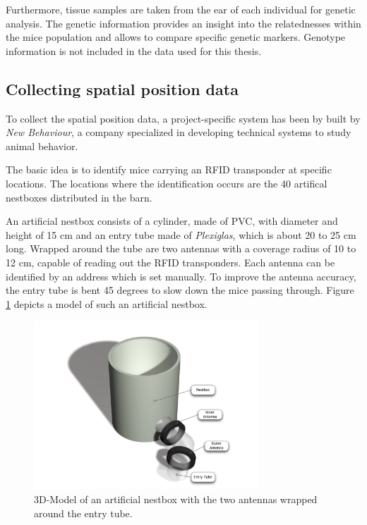 Furthermore, tissue samples are taken from the ear of each individual for genetic analysis. The genetic information provides an insight into the relatednesses within the mice population and allows to compare specific genetic markers. Genotype information is not included in the data used for this thesis.

\subsection{Collecting spatial position data}
\label{subsec:collectspatialpos}

To collect the spatial position data, a project-specific system has been by built by \textit{New Behaviour}, a company specialized in developing technical systems to study animal behavior. 

The basic idea is to identify mice carrying an RFID transponder at specific locations. The locations where the identification occurs are the 40 artifical nestboxes distributed in the barn. 

An artificial nestbox consists of a cylinder, made of \ac{PVC}, with diameter and height of 15 cm and an entry tube made of \textit{Plexiglas}, which is about 20 to 25 cm long. Wrapped around the tube are two antennas with a coverage radius of 10 to 12 cm, capable of reading out the RFID transponders. Each antenna can be identified by an address which is set manually. To improve the antenna accuracy, the entry tube is bent 45 degrees to slow down the mice passing through. Figure \ref{fig:artNestbox} depicts a model of such an artificial nestbox.

\begin{figure}[htbp]	
\centering	
\includegraphics[width=0.75\textwidth]{assets/pdf/box_schema.pdf}	
\caption[3D-Model of an artificial nestbox]{3D-Model of an artificial nestbox with the two antennas wrapped around the entry tube.}
\label{fig:artNestbox}
\end{figure}

